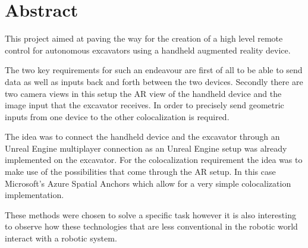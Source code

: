 \chapter{Abstract}


This project aimed at paving the way for the creation of a high level remote control for autonomous excavators using a handheld augmented reality device. 

The two key requirements for such an endeavour are first of all to be able to send data as well as inputs back and forth between the two devices. Secondly there are two camera views in this setup the AR view of the handheld device and the image input that the excavator receives. In order to precisely send geometric inputs from one device to the other colocalization is required. 

The idea was to connect the handheld device and the excavator through an Unreal Engine multiplayer connection as an Unreal Engine setup was already implemented on the excavator. For the colocalization requirement the idea was to make use of the possibilities that come through the AR setup. In this case Microsoft's Azure Spatial Anchors which allow for a very simple colocalization implementation.

These methods were chosen to solve a specific task however it is also interesting to observe how these technologies that are less conventional in the robotic world interact with a robotic system.

